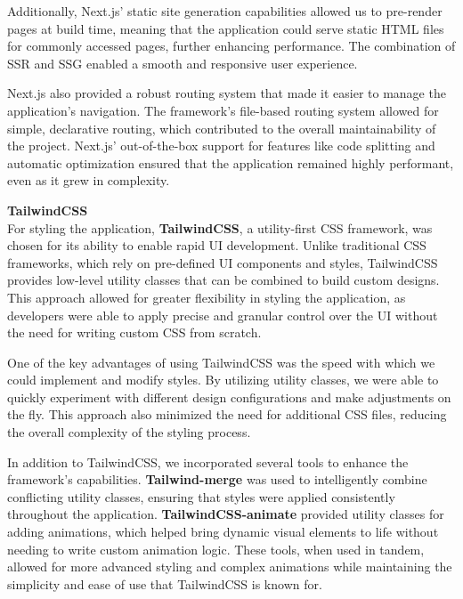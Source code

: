 Additionally, Next.js' static site generation capabilities allowed us to
pre{-}render pages at build time, meaning that the application could serve
static HTML files for commonly accessed pages, further enhancing
performance. The combination of SSR and SSG enabled a smooth and responsive
user experience.

Next.js also provided a robust routing system that made it easier to manage
the application's navigation. The framework's file{-}based routing system
allowed for simple, declarative routing, which contributed to the overall
maintainability of the project. Next.js' out{-}of{-}the{-}box support for
features like code splitting and automatic optimization ensured that the
application remained highly performant, even as it grew in complexity.

\newpage{}

\textbf{TailwindCSS} \\
For styling the application, \textbf{TailwindCSS}, a utility{-}first CSS
framework, was chosen for its ability to enable rapid UI development. Unlike
traditional CSS frameworks, which rely on pre{-}defined UI components and
styles, TailwindCSS provides low{-}level utility classes that can be
combined to build custom designs. This approach allowed for greater
flexibility in styling the application, as developers were able to apply
precise and granular control over the UI without the need for writing custom
CSS from scratch.

One of the key advantages of using TailwindCSS was the speed with which we
could implement and modify styles. By utilizing utility classes, we were
able to quickly experiment with different design configurations and make
adjustments on the fly. This approach also minimized the need for additional
CSS files, reducing the overall complexity of the styling process.

In addition to TailwindCSS, we incorporated several tools to enhance the
framework's capabilities. \textbf{Tailwind{-}merge} was used to
intelligently combine conflicting utility classes, ensuring that styles were
applied consistently throughout the application.
\textbf{TailwindCSS{-}animate} provided utility classes for adding
animations, which helped bring dynamic visual elements to life without
needing to write custom animation logic. These tools, when used in tandem,
allowed for more advanced styling and complex animations while maintaining
the simplicity and ease of use that TailwindCSS is known for.

\vspace{0.5cm}

